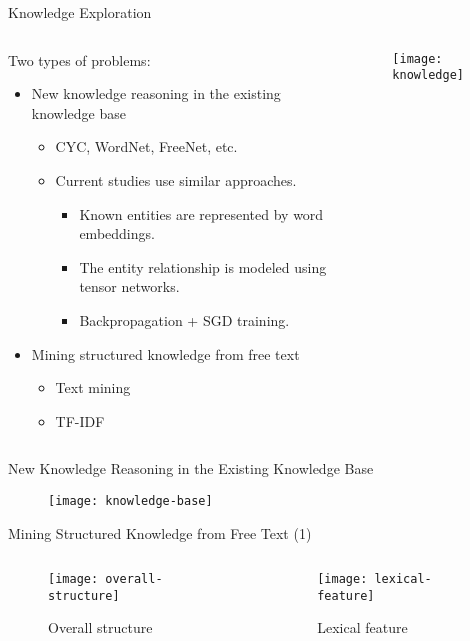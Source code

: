 \begin{frame}{Knowledge Exploration}
\begin{columns}[t]
\begin{column}{.5\textwidth}
Two types of problems:
\begin{itemize}
\item New knowledge reasoning in the existing knowledge base
\begin{itemize}
\item CYC, WordNet, FreeNet, etc.
\item Current studies use similar approaches.
\begin{itemize}
\item Known entities are represented by word embeddings.
\item The entity relationship is modeled using tensor networks.
\item Backpropagation + SGD training.
\end{itemize}
\end{itemize}
\item Mining structured knowledge from free text
\begin{itemize}
\item Text mining
\item TF-IDF
\end{itemize}
\end{itemize}
\end{column}
\begin{column}{.5\textwidth}
\begin{figure}[!]
\centering
\texttt{[image: knowledge]}
\end{figure}
\end{column}
\end{columns}
\end{frame}

\begin{frame}{New Knowledge Reasoning in the Existing Knowledge Base}
\begin{figure}[!]
\centering
\texttt{[image: knowledge-base]}
\end{figure}
\end{frame}

\begin{frame}{Mining Structured Knowledge from Free Text (1)}
\begin{columns}[t]
\begin{column}{.5\textwidth}
\begin{figure}[!]
\centering
\texttt{[image: overall-structure]}
\caption{Overall structure}
\end{figure}
\end{column}
\begin{column}{.5\textwidth}
\begin{figure}[!]
\centering
\texttt{[image: lexical-feature]}
\caption{Lexical feature}
\end{figure}
\end{column}
\end{columns}
\end{frame}


